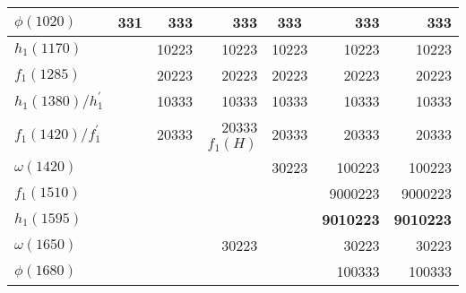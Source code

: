 \begin{tabular}{|l@{\tstrut}|r|r|r|c|r|r|}
$\phi(1020)$           &   331 &   333 &   333                &   333 &     333 & 333   \\ \hline
$h_1(1170)$            &       & 10223 & 10223                & 10223 &   10223 & 10223 \\ \hline
$f_1(1285)$            &       & 20223 & 20223                & 20223 &   20223 & 20223 \\ \hline
$h_1(1380)/h_1^\prime$ &       & 10333 & 10333                & 10333 &   10333 & 10333 \\ \hline
$f_1(1420)/f_1^\prime$ &       & 20333 & 20333 $f_1(H)$       & 20333 &   20333 & 20333 \\ \hline
$\omega(1420)$         &       &       &                      & 30223 &  100223 & 100223 \\ \hline
$f_1(1510)$            &       &       &                      &       & 9000223 & 9000223 \\ \hline
$h_1(1595)$            &       &       &                      &       & \bf{9010223} & \bf{9010223} \\ \hline
$\omega(1650)$         &       &       & 30223                &       &   30223 & 30223 \\ \hline
$\phi(1680)$           &       &       &                      &       &  100333 & 100333 \\ \hline
\end{tabular}

